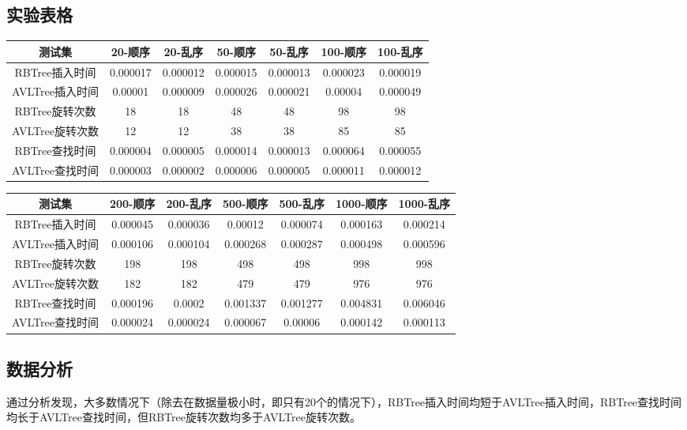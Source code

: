 \documentclass[UTF8]{ctexart}
\begin{document}
\subsection{实验表格}
\begin{center}
    \begin{tabular}{|c|c|c|c|c|c|c|}
        \hline
        测试集&	20-顺序&	20-乱序&	50-顺序&	50-乱序&	100-顺序&	100-乱序\\
        \hline
        RBTree插入时间&	0.000017&	0.000012&	0.000015&	0.000013&	0.000023&	0.000019\\
        \hline
        AVLTree插入时间&	0.00001&	0.000009&	0.000026&	0.000021&	0.00004&	0.000049\\
        \hline
        RBTree旋转次数&	18&	18&	48&	48&	98&	98\\
        \hline
        AVLTree旋转次数&	12&	12&	38&	38&	85&	85\\
        \hline
        RBTree查找时间&	0.000004&	0.000005&	0.000014&	0.000013&	0.000064&	0.000055\\
        \hline
        AVLTree查找时间&	0.000003&	0.000002&	0.000006&	0.000005&	0.000011&	0.000012\\
        \hline
    \end{tabular}   

    \begin{tabular}{|c|c|c|c|c|c|c|}
        \hline
        测试集&	200-顺序&	200-乱序&	500-顺序&	500-乱序&	1000-顺序&	1000-乱序\\
        \hline
        RBTree插入时间&	0.000045&	0.000036&	0.00012&	0.000074&	0.000163&	0.000214\\
        \hline
        AVLTree插入时间&	0.000106&	0.000104&	0.000268&	0.000287&	0.000498&	0.000596\\
        \hline
        RBTree旋转次数&	198&	198&	498&	498&	998&	998\\
        \hline
        AVLTree旋转次数&	182&	182&	479&	479&	976&	976\\
        \hline
        RBTree查找时间&	0.000196&	0.0002&	0.001337&	0.001277&	0.004831&	0.006046\\
        \hline
        AVLTree查找时间&	0.000024&	0.000024&	0.000067&	0.00006&	0.000142&	0.000113\\
        \hline
    \end{tabular} 
\end{center}

\subsection{数据分析}
通过分析发现，大多数情况下（除去在数据量极小时，即只有20个的情况下），RBTree插入时间均短于AVLTree插入时间，RBTree查找时间均长于AVLTree查找时间，但RBTree旋转次数均多于AVLTree旋转次数。
\end{document}
